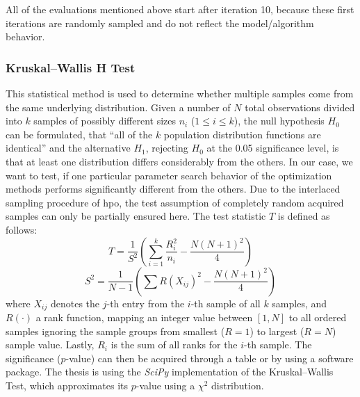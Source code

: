 All of the evaluations mentioned above start after iteration 10, because these first iterations are randomly sampled and do not reflect the model/algorithm behavior.

\subsubsection{Kruskal–Wallis H Test}
\label{chap:kruskal}
This statistical method is used to determine whether multiple samples come from the same underlying distribution. Given a number of $N$ total observations divided into $k$ samples of possibly different sizes $n_i$ ($1 \leq i \leq k$), the null hypothesis $H_0$ can be formulated, that \enquote{all of the $k$ population distribution functions are identical} \cite{conover1999practical} and the alternative $H_1$, rejecting $H_0$ at the 0.05 significance level, is that at least one distribution differs considerably from the others. In our case, we want to test, if one particular parameter search behavior of the optimization methods performs significantly different from the others. Due to the interlaced sampling procedure of \gls{hpo}, the test assumption of completely random acquired samples can only be partially ensured here. The test statistic $T$ is defined as follows:
\begin{equation}
	T = \frac{1}{S^2} \left(  \sum_{i=1}^{k} \frac{R_i^2}{n_i} - \frac{N(N+1)^2}{4}  \right) 
\end{equation}
\begin{equation*}
	S^2 = \frac{1}{N-1} \left(  \sum R(X_{ij})^2 - \frac{N(N+1)^2}{4}  \right) 
\end{equation*}
where $X_{ij}$ denotes the $j$-th entry from the $i$-th sample of all $k$ samples, and $R(\cdot)$ a rank function, mapping an integer value between $\left[ 1,N\right] $ to all ordered samples ignoring the sample groups from smallest ($R = 1$) to largest ($R = N$) sample value. Lastly, $R_i$ is the sum of all ranks for the $i$-th sample. The significance ($p$-value) can then be acquired through a table or by using a software package. The thesis is using the \textit{SciPy} implementation of the Kruskal–Wallis Test, which approximates its $p$-value using a $\chi^2$ distribution.

